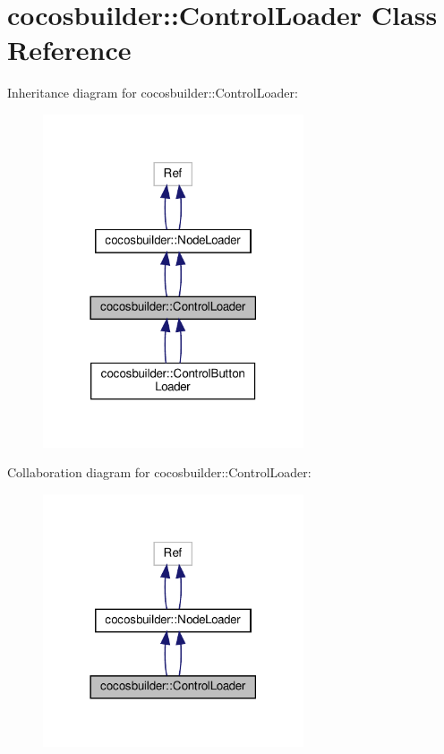 \hypertarget{classcocosbuilder_1_1ControlLoader}{}\section{cocosbuilder\+:\+:Control\+Loader Class Reference}
\label{classcocosbuilder_1_1ControlLoader}


Inheritance diagram for cocosbuilder\+:\+:Control\+Loader\+:
\nopagebreak
\begin{figure}[H]
\begin{center}
\leavevmode
\includegraphics[width=218pt]{classcocosbuilder_1_1ControlLoader__inherit__graph}
\end{center}
\end{figure}


Collaboration diagram for cocosbuilder\+:\+:Control\+Loader\+:
\nopagebreak
\begin{figure}[H]
\begin{center}
\leavevmode
\includegraphics[width=218pt]{classcocosbuilder_1_1ControlLoader__coll__graph}
\end{center}
\end{figure}
